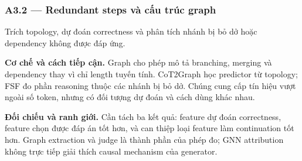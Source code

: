 \subsubsection*{A3.2 — Redundant steps và cấu trúc graph}
Trích topology, dự đoán correctness và phân tích nhánh bị bỏ dở hoặc dependency không được đáp ứng.

\noindent\textbf{Cơ chế và cách tiếp cận.} Graph cho phép mô tả branching, merging và dependency thay vì chỉ length tuyến tính. CoT2Graph học predictor từ topology; FSF đo phần reasoning thuộc các nhánh bị bỏ dở. Chúng cung cấp tín hiệu vượt ngoài số token, nhưng có đối tượng dự đoán và cách dùng khác nhau.\par
\noindent\textbf{Đối chiếu và ranh giới.} Cần tách ba kết quả: feature dự đoán correctness, feature chọn được đáp án tốt hơn, và can thiệp loại feature làm continuation tốt hơn. Graph extraction và judge là thành phần của phép đo; GNN attribution không trực tiếp giải thích causal mechanism của generator.\par

